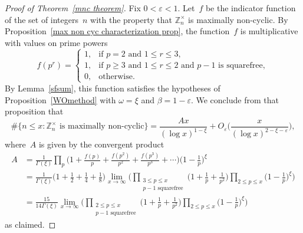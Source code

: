 \documentclass[12pt,reqno]{amsart}
\theoremstyle{definition}
\newcommand{\Z}{{\mathbb Z}}
\newcommand{\ep}{\varepsilon}
\begin{document}
\begin{proof}[Proof of Theorem~\ref{mnc theorem}]
Fix $0<\ep<1$.
Let~$f$ be the indicator function of the set of integers~$n$ with the property that $\Z_n^\times$ is maximally non-cyclic. By Proposition~\ref{max non cyc characterization prop}, the function~$f$ is multiplicative with values on prime powers
\[
f(p^r) = \begin{cases}
1, &\text{if $p=2$ and $1\le r\le3$}, \\
1, &\text{if $p\ge3$ and $1\le r\le2$ and $p-1$ is squarefree}, \\
0, &\text{otherwise}.
\end{cases}
\]
By Lemma~\ref{sfsum}, this function satisfies the hypotheses of Proposition~\ref{WOmethod} with $\omega=\xi$ and $\beta=1-\ep$. We conclude from that proposition that
\[
\#\big\{ n\le x\colon \Z_n^\times \text{ is maximally non-cyclic} \} = \frac{Ax}{(\log x)^{1-\xi}} + O_\ep\bigg( \frac x{(\log x)^{2-\xi-\ep}} \bigg),
\]
where~$A$ is given by the convergent product
\begin{align*}
A&=\frac 1{\Gamma(\xi)}\prod_p\bigg(1+\frac{f(p)}{p}+\frac{f(p^2)}{p^2}+\frac{f(p^3)}{p^3}+\cdots\bigg) \bigg(1-\frac{1}{p}\bigg)^{\xi}\\
&=\frac 1{\Gamma(\xi)} {\bigg(1+\frac 12+\frac 14+\frac 18\bigg)} \lim_{x\to\infty}\bigg(\prod_{\substack{3\le p\le x\\p-1\text{ squarefree}}}\bigg(1+\frac 1p+\frac 1{p^2}\bigg) \prod_{2\le p\le x}\bigg(1-\frac 1p\bigg)^\xi\bigg)\\
&=\frac {15}{14\Gamma(\xi)}\lim_{x\to\infty}\bigg(\prod_{\substack{2\le p\le x\\p-1\text{ squarefree}}}\bigg(1+\frac 1p+\frac 1{p^2}\bigg) \prod_{2\le p\le x}\bigg(1-\frac 1p\bigg)^\xi\bigg)
\end{align*}
as claimed.
\end{proof}




\end{document}
